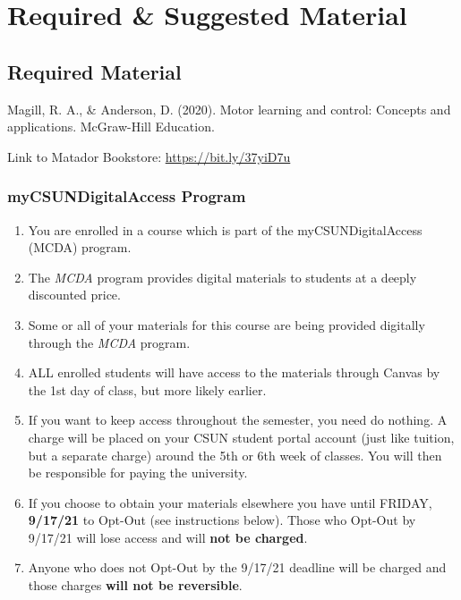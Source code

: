 \documentclass[11pt,]{article}
\providecommand{\tightlist}{%
  \setlength{\itemsep}{0pt}\setlength{\parskip}{0pt}}
\begin{document}
\hypertarget{required-suggested-material}{%
\section{Required \& Suggested
Material}\label{required-suggested-material}}

\hypertarget{required-material}{%
\subsection{Required Material}\label{required-material}}

Magill, R. A., \& Anderson, D. (2020). Motor learning and control:
Concepts and applications. McGraw-Hill Education.

Link to Matador Bookstore: \url{https://bit.ly/37yiD7u}

\hypertarget{mycsundigitalaccess-program}{%
\subsubsection{myCSUNDigitalAccess
Program}\label{mycsundigitalaccess-program}}

\begin{enumerate}
\def\labelenumi{\arabic{enumi}.}
\tightlist
\item
  You are enrolled in a course which is part of the myCSUNDigitalAccess
  (MCDA) program.
\item
  The \emph{MCDA} program provides digital materials to students at a
  deeply discounted price.
\item
  Some or all of your materials for this course are being provided
  digitally through the \emph{MCDA} program.
\item
  ALL enrolled students will have access to the materials through Canvas
  by the 1st day of class, but more likely earlier.
\item
  If you want to keep access throughout the semester, you need do
  nothing. A charge will be placed on your CSUN student portal account
  (just like tuition, but a separate charge) around the 5th or 6th week
  of classes. You will then be responsible for paying the university.
\item
  If you choose to obtain your materials elsewhere you have until
  FRIDAY, \textbf{9/17/21} to Opt-Out (see instructions below). Those
  who Opt-Out by 9/17/21 will lose access and will \textbf{not be
  charged}.
\item
  Anyone who does not Opt-Out by the 9/17/21 deadline will be charged
  and those charges \textbf{will not be reversible}.
\end{enumerate}
\end{document}
